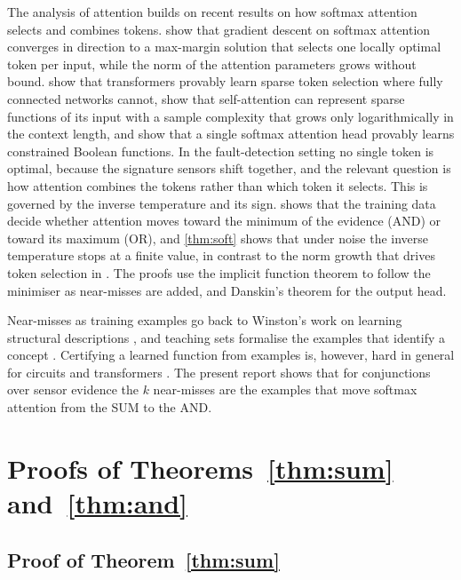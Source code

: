 The analysis of attention builds on recent results on how softmax attention selects and combines tokens. \citet{tarzanagh2023} show that gradient descent on softmax attention converges in direction to a max-margin solution that selects one locally optimal token per input, while the norm of the attention parameters grows without bound. \citet{wang2024} show that transformers provably learn sparse token selection where fully connected networks cannot, \citet{edelman2022} show that self-attention can represent sparse functions of its input with a sample complexity that grows only logarithmically in the context length, and \citet{hu2025} show that a single softmax attention head provably learns constrained Boolean functions. In the fault-detection setting no single token is optimal, because the signature sensors shift together, and the relevant question is how attention combines the tokens rather than which token it selects. This is governed by the inverse temperature and its sign.  shows that the training data decide whether attention moves toward the minimum of the evidence (AND) or toward its maximum (OR), and \cref{thm:soft} shows that under noise the inverse temperature stops at a finite value, in contrast to the norm growth that drives token selection in \citet{tarzanagh2023}. The proofs use the implicit function theorem \citep{rudin1976} to follow the minimiser as near-misses are added, and Danskin's theorem \citep{danskin1967} for the output head.

Near-misses as training examples go back to Winston's work on learning structural descriptions \citep{winston1970}, and teaching sets formalise the examples that identify a concept \citep{goldman1995}. Certifying a learned function from examples is, however, hard in general for circuits and transformers \citep{backdeluca2026}. The present report shows that for conjunctions over sensor evidence the $k$ near-misses are the examples that move softmax attention from the SUM to the AND.

\section{Proofs of Theorems~\ref*{thm:sum} and~\ref*{thm:and}}\label{app:proofs12}

\subsection{Proof of Theorem~\ref*{thm:sum}}\label{app:thm1}

